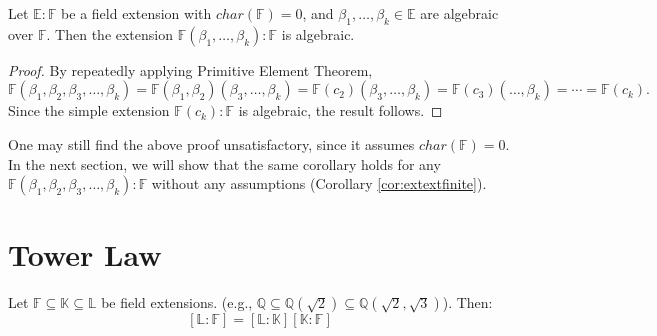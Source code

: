 \begin{corollary}
Let $\mathbb{E}:\mathbb{F}$ be a field extension with $char(\mathbb{F}) = 0$, and $\beta_1, \dots, \beta_k \in \mathbb{E}$ are algebraic over $\mathbb{F}$. Then the extension $\mathbb{F}(\beta_1, \dots, \beta_k):\mathbb{F}$ is algebraic.
\end{corollary}
\begin{proof}
By repeatedly applying Primitive Element Theorem, 
$$\mathbb{F}(\beta_1, \beta_2, \beta_3,\dots, \beta_k) = \mathbb{F}(\beta_1,\beta_2) (\beta_3,\dots, \beta_k) = \mathbb{F}(c_2)(\beta_3,\dots, \beta_k) = \mathbb{F}(c_3)(\dots, \beta_k) = \cdots = \mathbb{F}(c_k).$$
Since the simple extension $\mathbb{F}(c_k) : \mathbb{F}$ is algebraic, the result follows.
\end{proof}
One may still find the above proof unsatisfactory, since it assumes $char(\mathbb{F}) = 0$. In the next section, we will show that the same corollary holds for any $\mathbb{F}(\beta_1, \beta_2, \beta_3,\dots, \beta_k) : \mathbb{F}$ without any assumptions (Corollary \ref{cor:extextfinite}).

\section{Tower Law}
\begin{theorem}
Let $\mathbb{F} \subseteq \mathbb{K} \subseteq \mathbb{L}$ be field extensions.
(e.g., $\mathbb{Q} \subseteq \mathbb{Q}(\sqrt{2}) \subseteq \mathbb{Q}(\sqrt{2}, \sqrt{3})$).
Then:
\[ [\mathbb{L}:\mathbb{F}] = [\mathbb{L}:\mathbb{K}] [\mathbb{K}:\mathbb{F}] \]
\end{theorem}

